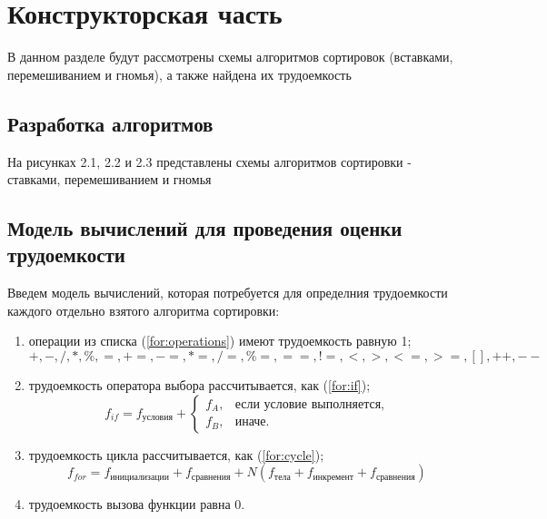 \chapter{Конструкторская часть}
В данном разделе будут рассмотрены схемы алгоритмов сортировок (вставками, перемешиванием и гномья), а также найдена их трудоемкость

\section{Разработка алгоритмов}
На рисунках 2.1, 2.2 и 2.3 представлены схемы алгоритмов сортировки - ставками, перемешиванием и гномья


\clearpage

\section{Модель вычислений для проведения оценки трудоемкости}
Введем модель вычислений, которая потребуется для определния трудоемкости каждого отдельно взятого алгоритма сортировки:

\begin{enumerate}
	\item операции из списка (\ref{for:operations}) имеют трудоемкость равную 1;
	\begin{equation}
		\label{for:operations}
		+, -, /, *, \%, =, +=, -=, *=, /=, \%=, ==, !=, <, >, <=, >=, [], ++, {-}-
	\end{equation}
	\item трудоемкость оператора выбора  рассчитывается, как (\ref{for:if});
	\begin{equation}
		\label{for:if}
		f_{if} = f_{\text{условия}} +
		\begin{cases}
			f_A, & \text{если условие выполняется,}\\
			f_B, & \text{иначе.}
		\end{cases}
	\end{equation}
	\item трудоемкость цикла рассчитывается, как (\ref{for:cycle});
	\begin{equation}
		\label{for:cycle}
		f_{for} = f_{\text{инициализации}} + f_{\text{сравнения}} + N(f_{\text{тела}} + f_{\text{инкремент}} + f_{\text{сравнения}})
	\end{equation}
	\item трудоемкость вызова функции равна 0.
\end{enumerate}


